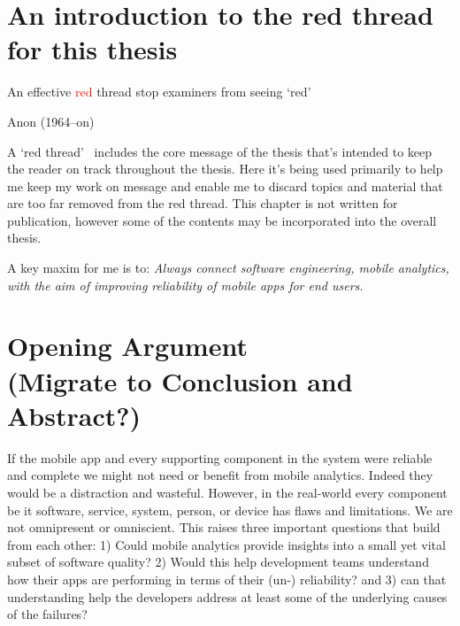 \section[An introduction to the red thread for this thesis]{An introduction to the red thread for this thesis}
\label{section_read_thread} 

\epigraph{{An effective \textcolor{red}{red}} thread stop examiners from seeing `red'}{Anon (1964--on)}

A `red thread'~\footnotemark 
includes the core message of the thesis that's intended to keep the reader on track throughout the thesis. Here it's being used primarily to help me keep my work on message and enable me to discard topics and material that are too far removed from the red thread. This chapter is not written for publication, however some of the contents may be incorporated into the overall thesis.


A key maxim for me is to: \emph{Always connect software engineering, mobile analytics, with the aim of improving reliability of mobile apps for end users.}



\clearpage
\section[Opening argument]{Opening Argument \\ \small{(Migrate to Conclusion and Abstract?)}}
If the mobile app and every supporting component in the system were reliable and complete we might not need or benefit from mobile analytics. Indeed they would be a distraction and wasteful. However, in the real-world every component be it software, service, system, person, or device has flaws and limitations. We are not omnipresent or omniscient. 
This raises three important questions that build from each other: 1) Could mobile analytics provide insights into a small yet vital subset of software quality? 2) Would this help development teams understand how their apps are performing in terms of their (un-) reliability? and 3) can that understanding help the developers address at least some of the underlying causes of the failures?

